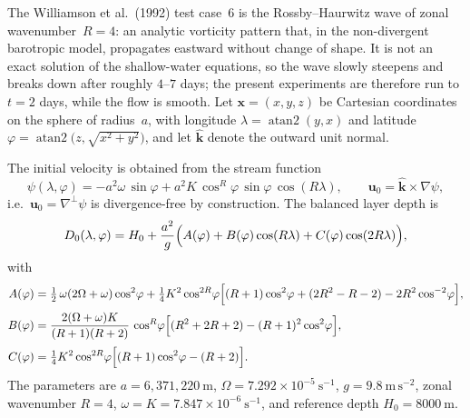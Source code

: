 The Williamson et al.\ (1992) test case~6 is the Rossby--Haurwitz wave of zonal
wavenumber~$R=4$: an analytic vorticity pattern that, in the non-divergent
barotropic model, propagates eastward without change of shape. It is not an exact
solution of the shallow-water equations, so the wave slowly steepens and breaks
down after roughly $4$--$7$ days; the present experiments are therefore run to
$t = 2$ days, while the flow is smooth. Let $\mathbf{x}=(x,y,z)$ be Cartesian
coordinates on the sphere of radius~$a$, with longitude
$\lambda=\operatorname{atan2}(y,x)$ and latitude
$\varphi=\operatorname{atan2}\!\bigl(z,\sqrt{x^2+y^2}\bigr)$, and let
$\hat{\mathbf{k}}$ denote the outward unit normal.

The initial velocity is obtained from the stream function
%
\begin{equation}
  \psi(\lambda,\varphi) = -a^{2}\omega\,\sin\varphi
       + a^{2}K\,\cos^{R}\!\varphi\,\sin\varphi\,\cos(R\lambda),
  \qquad
  \mathbf{u}_0 = \hat{\mathbf{k}}\times\nabla\psi ,
  \label{eq:w6-u}
\end{equation}
%
i.e.\ $\mathbf{u}_0=\nabla^{\perp}\psi$ is divergence-free by construction. The
balanced layer depth is
%
\begin{equation}
  D_0(\lambda,\varphi) = H_0
     + \frac{a^{2}}{g}\Bigl(A(\varphi) + B(\varphi)\cos(R\lambda)
       + C(\varphi)\cos(2R\lambda)\Bigr),
  \label{eq:w6-D}
\end{equation}
%
with
%
\begin{align}
  A(\varphi) &= \tfrac12\,\omega(2\Omega+\omega)\cos^{2}\!\varphi
     + \tfrac14 K^{2}\cos^{2R}\!\varphi
       \Bigl[(R+1)\cos^{2}\!\varphi + (2R^{2}-R-2)
             - 2R^{2}\cos^{-2}\!\varphi\Bigr], \label{eq:w6-A}\\[2pt]
  B(\varphi) &= \frac{2(\Omega+\omega)K}{(R+1)(R+2)}\,
       \cos^{R}\!\varphi\Bigl[(R^{2}+2R+2) - (R+1)^{2}\cos^{2}\!\varphi\Bigr],
       \label{eq:w6-B}\\[2pt]
  C(\varphi) &= \tfrac14 K^{2}\cos^{2R}\!\varphi
       \Bigl[(R+1)\cos^{2}\!\varphi - (R+2)\Bigr]. \label{eq:w6-C}
\end{align}
%
The parameters are
$a = 6{,}371{,}220~\mathrm{m}$,
$\Omega = 7.292\times10^{-5}~\mathrm{s^{-1}}$,
$g = 9.8~\mathrm{m\,s^{-2}}$,
zonal wavenumber $R = 4$,
$\omega = K = 7.847\times10^{-6}~\mathrm{s^{-1}}$,
and reference depth $H_0 = 8000~\mathrm{m}$.
